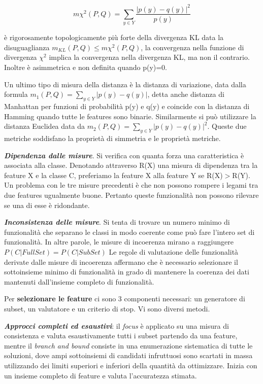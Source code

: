 \documentclass[a4paper]{extarticle}
\begin{document}
\begin{equation*}
m \chi ^2(P,Q) = \sum_{y \in Y} \dfrac{|p(y)-q(y)|^2}{p(y)}
\end{equation*}

è rigorosamente topologicamente più forte della divergenza KL data la disuguaglianza $m_{KL}(P,Q) \leq m \chi ^2 (P,Q)$, la convergenza nella funzione di divergenza $\chi ^2$ implica la convergenza nella divergenza KL, ma non il contrario. Inoltre è asimmetrica e non definita quando p(y)=0.

Un ultimo tipo di misura della distanza è la distanza di variazione, data dalla formula $m_1 (P,Q)= \sum\limits_{y \in Y}|p(y)-q(y)|$, detta anche distanza di Manhattan per funzioni di probabilità p(y) e q(y) e coincide con la distanza di Hamming quando tutte le features sono binarie. Similarmente si può utilizzare la distanza Euclidea data da $m_2 (P,Q)= \sum\limits_{y \in Y} |p(y)-q(y)|^2$. Queste due metriche soddisfano la proprietà di simmetria e le proprietà metriche.

\textbf{\textit{Dipendenza dalle misure}}. Si verifica con quanta forza una caratteristica è associata alla classe. Denotando attraverso R(X) una misura di dipendenza tra la feature X e la classe C, preferiamo la feature X alla feature Y se R(X)$>$R(Y). Un problema con le tre misure precedenti è che non possono rompere i legami tra due features ugualmente buone. Pertanto queste funzionalità non possono rilevare se una di esse è ridondante.

\textbf{\textit{Inconsistenza delle misure}}. Si tenta di trovare un numero minimo di funzionalità che separano le classi in modo coerente come può fare l'intero set di funzionalità. In altre parole, le misure di incoerenza mirano a raggiungere $P(C|FullSet)= P(C|SubSet)$ Le regole di valutazione delle funzionalità derivate dalle misure di incoerenza affermano che è necessario selezionare il sottoinsieme minimo di funzionalità in grado di mantenere la coerenza dei dati mantenuti dall'insieme completo di funzionalità.

Per \textbf{selezionare le feature} ci sono 3 componenti necessari: un generatore di subset, un valutatore e un criterio di stop. Vi sono diversi metodi. 

\textbf{\textit{Approcci completi ed esaustivi}}: il \textit{focus} è applicato su una misura di consistenza e valuta esaustivamente tutti i subset partendo da una feature, mentre il \textit{branch and bound} consiste in una enumerazione sistematica di tutte le soluzioni, dove ampi sottoinsiemi di candidati infruttuosi sono scartati in massa utilizzando dei limiti superiori e inferiori della quantità da ottimizzare. Inizia con un insieme completo di feature e valuta l'accuratezza stimata. 
\end{document}
